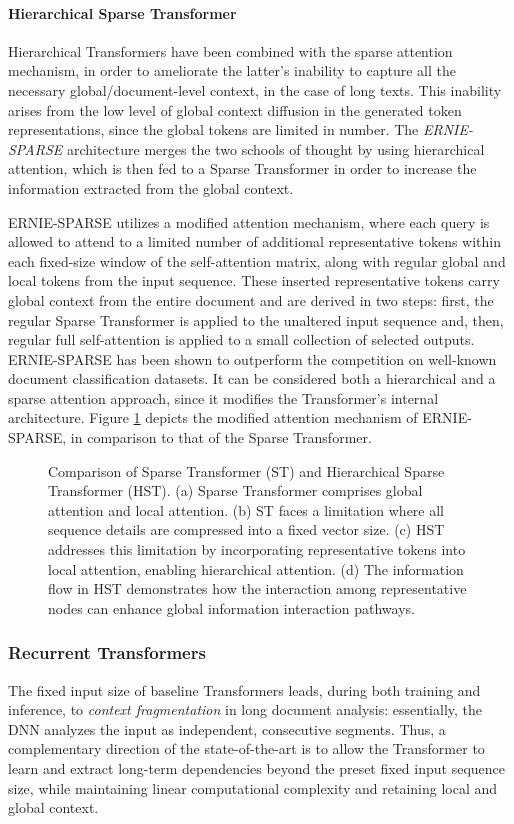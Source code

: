 \documentclass[preprint,review,10pt]{elsarticle}
\begin{document}
	\paragraph{Hierarchical Sparse Transformer} Hierarchical Transformers have been combined with the sparse attention mechanism, in order to ameliorate the latter's inability to capture all the necessary global/document-level context, in the case of long texts. This inability arises from the low level of global context diffusion in the generated token representations, since the global tokens are limited in number. The \textit{ERNIE-SPARSE} architecture \cite{liu} merges the two schools of thought by using hierarchical attention, which is then fed to a Sparse Transformer in order to increase the information extracted from the global context.
	
	ERNIE-SPARSE utilizes a modified attention mechanism, where each query is allowed to attend to a limited number of additional representative tokens within each fixed-size window of the self-attention matrix, along with regular global and local tokens from the input sequence. These inserted representative tokens carry global context from the entire document and are derived in two steps: first, the regular Sparse Transformer is applied to the unaltered input sequence and, then, regular full self-attention is applied to a small collection of selected outputs. ERNIE-SPARSE has been shown to outperform the competition on well-known document classification datasets. It can be considered both a hierarchical and a sparse attention approach, since it modifies the Transformer's internal architecture. Figure \ref{fig::ERNIE} depicts the modified attention mechanism of ERNIE-SPARSE, in comparison to that of the Sparse Transformer.
	
	\begin{figure}
		\centering
		
		\caption{Comparison of Sparse Transformer (ST) and Hierarchical Sparse Transformer (HST). (a) Sparse Transformer comprises global attention and local attention. (b) ST faces a limitation where all sequence details are compressed into a fixed vector size. (c) HST addresses this limitation by incorporating representative tokens into local attention, enabling hierarchical attention. (d) The information flow in HST demonstrates how the interaction among representative nodes can enhance global information interaction pathways.}
		\label{fig::ERNIE}
	\end{figure}
	
	\subsubsection{Recurrent Transformers}
	The fixed input size of baseline Transformers leads, during both training and inference, to \textit{context fragmentation} in long document analysis: essentially, the DNN analyzes the input as independent, consecutive segments. Thus, a complementary direction of the state-of-the-art is to allow the Transformer to learn and extract long-term dependencies beyond the preset fixed input sequence size, while maintaining linear computational complexity and retaining local and global context.
	
\end{document}
